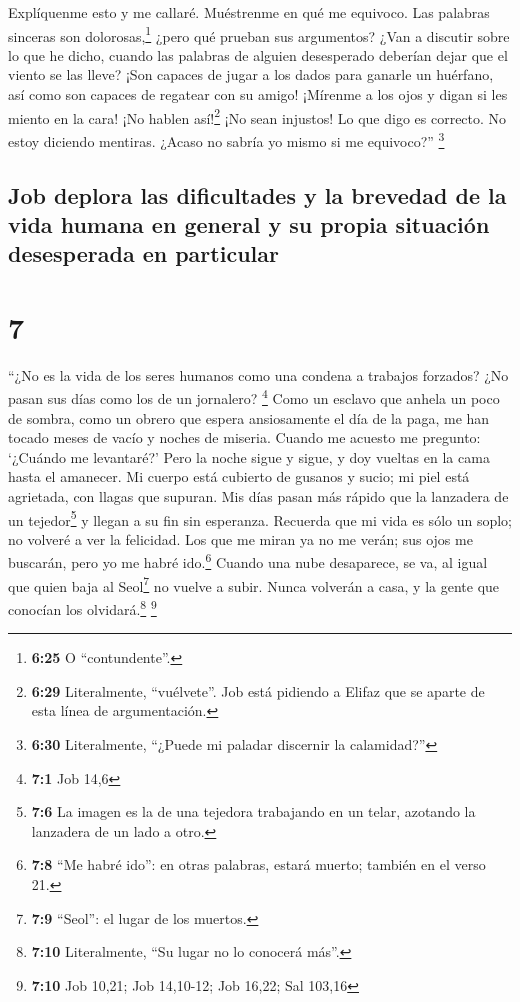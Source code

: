  Explíquenme esto y me callaré. Muéstrenme en qué me
equivoco.  Las palabras sinceras son
dolorosas,\footnote{\textbf{6:25} O ``contundente''.} ¿pero qué prueban
sus argumentos?  ¿Van a discutir sobre lo que he dicho,
cuando las palabras de alguien desesperado deberían dejar que el viento
se las lleve?  ¡Son capaces de jugar a los dados para
ganarle un huérfano, así como son capaces de regatear con su amigo!
 ¡Mírenme a los ojos y digan si les miento en la cara!
 ¡No hablen así!\footnote{\textbf{6:29} Literalmente,
  ``vuélvete''. Job está pidiendo a Elifaz que se aparte de esta línea
  de argumentación.} ¡No sean injustos! Lo que digo es correcto.
 No estoy diciendo mentiras. ¿Acaso no sabría yo mismo si
me equivoco?'' \footnote{\textbf{6:30} Literalmente, ``¿Puede mi paladar
  discernir la calamidad?''}

\hypertarget{job-deplora-las-dificultades-y-la-brevedad-de-la-vida-humana-en-general-y-su-propia-situaciuxf3n-desesperada-en-particular}{%
\subsection{Job deplora las dificultades y la brevedad de la vida humana
en general y su propia situación desesperada en
particular}\label{job-deplora-las-dificultades-y-la-brevedad-de-la-vida-humana-en-general-y-su-propia-situaciuxf3n-desesperada-en-particular}}

\hypertarget{section-6}{%
\section{7}\label{section-6}}

 ``¿No es la vida de los seres humanos como una condena a
trabajos forzados? ¿No pasan sus días como los de un jornalero?
\footnote{\textbf{7:1} Job 14,6}  Como un esclavo que
anhela un poco de sombra, como un obrero que espera ansiosamente el día
de la paga,  me han tocado meses de vacío y noches de
miseria.  Cuando me acuesto me pregunto: `¿Cuándo me
levantaré?' Pero la noche sigue y sigue, y doy vueltas en la cama hasta
el amanecer.  Mi cuerpo está cubierto de gusanos y sucio;
mi piel está agrietada, con llagas que supuran.  Mis días
pasan más rápido que la lanzadera de un tejedor\footnote{\textbf{7:6} La
  imagen es la de una tejedora trabajando en un telar, azotando la
  lanzadera de un lado a otro.} y llegan a su fin sin esperanza.
 Recuerda que mi vida es sólo un soplo; no volveré a ver
la felicidad.  Los que me miran ya no me verán; sus ojos
me buscarán, pero yo me habré ido.\footnote{\textbf{7:8} ``Me habré
  ido'': en otras palabras, estará muerto; también en el verso 21.}
 Cuando una nube desaparece, se va, al igual que quien
baja al Seol\footnote{\textbf{7:9} ``Seol'': el lugar de los muertos.}
no vuelve a subir.  Nunca volverán a casa, y la gente que
conocían los olvidará.\footnote{\textbf{7:10} Literalmente, ``Su lugar
  no lo conocerá más''.} \footnote{\textbf{7:10} Job 10,21; Job
  14,10-12; Job 16,22; Sal 103,16}

